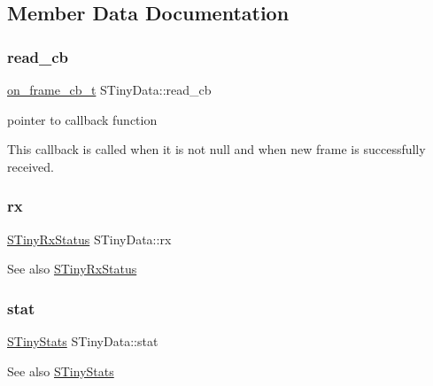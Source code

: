 \subsection{Member Data Documentation}
\mbox{\label{structSTinyData_a31ba50154472c11e0d063b0aeef95f4d}} 
\subsubsection{\texorpdfstring{read\+\_\+cb}{read\_cb}}
{\footnotesize\ttfamily \hyperlink{tiny__types_8h_ad6bf709565b8aecb9e6ecf196f219d54}{on\+\_\+frame\+\_\+cb\+\_\+t} S\+Tiny\+Data\+::read\+\_\+cb}



pointer to callback function 

This callback is called when it is not null and when new frame is successfully received. \mbox{\label{structSTinyData_aa3b43db99a1a6bf3d562f932d5a539db}} 
\subsubsection{\texorpdfstring{rx}{rx}}
{\footnotesize\ttfamily \hyperlink{structSTinyRxStatus}{S\+Tiny\+Rx\+Status} S\+Tiny\+Data\+::rx}

\begin{DoxySeeAlso}{See also}
\hyperlink{structSTinyRxStatus}{S\+Tiny\+Rx\+Status} 
\end{DoxySeeAlso}
\mbox{\label{structSTinyData_a16ba8c9e60d6aee3fcd4909f85561f3d}} 
\subsubsection{\texorpdfstring{stat}{stat}}
{\footnotesize\ttfamily \hyperlink{structSTinyStats}{S\+Tiny\+Stats} S\+Tiny\+Data\+::stat}

\begin{DoxySeeAlso}{See also}
\hyperlink{structSTinyStats}{S\+Tiny\+Stats} 
\end{DoxySeeAlso}
\mbox{\label{structSTinyData_aa099adb35f3494332747eb18851fbb23}} 
